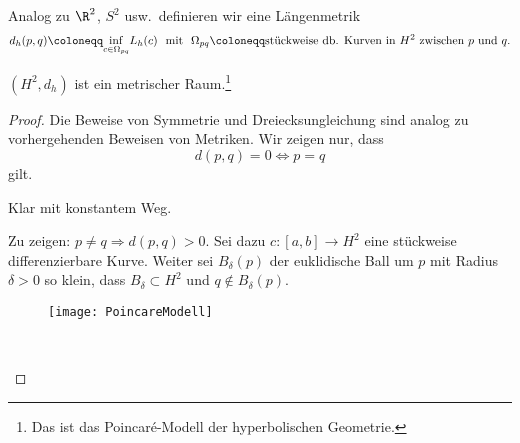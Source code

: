 \begin{definition}
  Analog zu \( \R^2 \), \( S^2 \) usw.\ definieren wir eine Längenmetrik
  \begin{equation*}
    d_h(p,q) \coloneqq \underset{c \in \Omega_{pq}}{\inf} L_h(c) \ \text{ mit } \ \Omega_{pq} \coloneqq \text{stückweise db. Kurven in \( H^2 \) zwischen \( p \) und \( q \).}
  \end{equation*}
\end{definition}

\begin{theorem}
  \( (H^2, d_h) \) ist ein metrischer Raum.\footnote{Das ist das Poincaré-Modell der hyperbolischen Geometrie.}

  \begin{proof}
    Die Beweise von Symmetrie und Dreiecksungleichung sind analog zu vorhergehenden Beweisen von Metriken. Wir zeigen nur, dass
    \begin{equation*}
      d(p,q) = 0 \Leftrightarrow p = q
    \end{equation*}
    gilt.
    \begin{itemize}
      \item[\( \Leftarrow \)] Klar mit konstantem Weg.

      \begin{minipage}{.6\textwidth}
        \vspace{1em}
        \item[\( \Rightarrow \)] Zu zeigen: \( p \neq q \Rightarrow d(p,q) > 0 \). Sei dazu \( c:[a,b] \to H^2 \) eine stückweise differenzierbare Kurve. Weiter sei \( B_\delta(p) \) der euklidische Ball um \( p \) mit Radius \( \delta > 0 \) so klein, dass \( B_\delta \subset H^2 \) und \( q \not \in B_\delta(p) \).        
      \end{minipage}
      \hfill
      \begin{minipage}{.375\textwidth}
        \begin{figure}[H]
          \texttt{[image: PoincareModell]}
        \end{figure}
      \end{minipage}
      \  \\


\end{itemize}
\end{proof}
\end{theorem}
